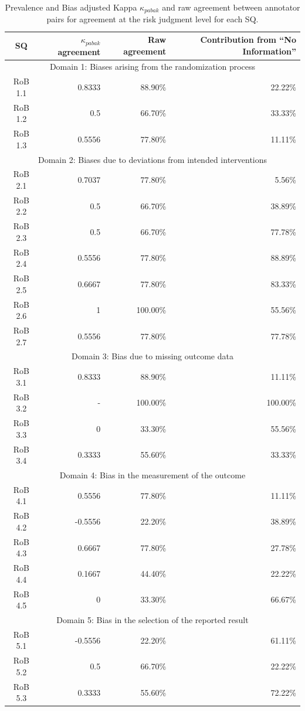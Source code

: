 \documentclass[sn-mathphys,Numbered]{sn-jnl}%
\theoremstyle{thmstyleone}%
\theoremstyle{thmstyletwo}%
\theoremstyle{thmstylethree}%
\begin{document}
%
%
%
\begin{table}[]
    \caption{Prevalence and Bias adjusted Kappa $\kappa_{pabak}$ and raw agreement between annotator pairs for agreement at the risk judgment level for each SQ.}
    \label{tab:IAA_response}
    \begin{tabular}{crrr}
    \toprule[1.0pt]
        SQ & $\kappa_{pabak}$ agreement & Raw agreement & Contribution from ``No Information'' \\
    \midrule[1.0pt]
        \multicolumn{4}{c}{Domain 1: Biases arising from the randomization process} \\
        \hline
        RoB 1.1 & 0.8333 & 88.90\% & 22.22\% \\
        RoB 1.2 & 0.5 & 66.70\% & 33.33\% \\
        RoB 1.3 & 0.5556 & 77.80\% & 11.11\% \\
        \hline 
        \multicolumn{4}{c}{Domain 2: Biases due to deviations from intended interventions} \\
        \hline
        RoB 2.1 & 0.7037 & 77.80\% & 5.56\% \\
        RoB 2.2 & 0.5 & 66.70\% & 38.89\% \\
        RoB 2.3 & 0.5 & 66.70\% & 77.78\% \\
        RoB 2.4 & 0.5556 & 77.80\% & 88.89\% \\
        RoB 2.5 & 0.6667 & 77.80\% & 83.33\% \\
        RoB 2.6 & 1 & 100.00\% & 55.56\% \\
        RoB 2.7 & 0.5556 & 77.80\% & 77.78\% \\
        \hline
        \multicolumn{4}{c}{Domain 3: Bias due to missing outcome data} \\
        \hline
        RoB 3.1 & 0.8333 & 88.90\% & 11.11\% \\
        RoB 3.2 & - & 100.00\% & 100.00\% \\
        RoB 3.3 & 0 & 33.30\% & 55.56\% \\
        RoB 3.4 & 0.3333 & 55.60\% & 33.33\% \\
        \hline
        \multicolumn{4}{c}{Domain 4: Bias in the measurement of the outcome} \\
        \hline
        RoB 4.1 & 0.5556 & 77.80\% & 11.11\% \\
        RoB 4.2 & -0.5556 & 22.20\% & 38.89\% \\
        RoB 4.3 & 0.6667 & 77.80\% & 27.78\% \\
        RoB 4.4 & 0.1667 & 44.40\% & 22.22\% \\
        RoB 4.5 & 0 & 33.30\% & 66.67\% \\
        \hline
        \multicolumn{4}{c}{Domain 5: Bias in the selection of the reported result} \\
        \hline
        RoB 5.1 & -0.5556 & 22.20\% & 61.11\% \\
        RoB 5.2 & 0.5 & 66.70\% & 22.22\% \\
        RoB 5.3 & 0.3333 & 55.60\% & 72.22\% \\
    \bottomrule[1.0pt]
    \end{tabular}
\end{table}
\end{document}
